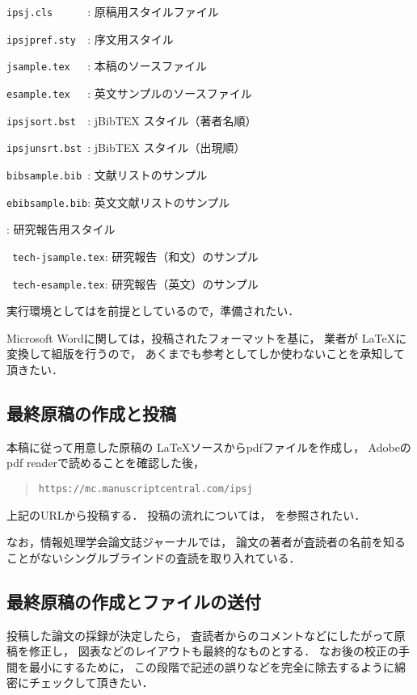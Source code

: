 \documentclass[submit]{ipsj}
\def\|{\verb|}
\begin{document}
\begin{Enumerate}
\item \|ipsj.cls      |: 原稿用スタイルファイル
\item \|ipsjpref.sty  |: 序文用スタイル
\item \|jsample.tex   |: 本稿のソースファイル
\item \|esample.tex   |: 英文サンプルのソースファイル
\item \|ipsjsort.bst  |: jBibTEX スタイル（著者名順）
\item \|ipsjunsrt.bst |: jBibTEX スタイル（出現順）
\item \|bibsample.bib |: 文献リストのサンプル
\item \|ebibsample.bib|: 英文文献リストのサンプル
\item {}: 研究報告用スタイル
\item \| tech-jsample.tex|: 研究報告（和文）のサンプル
\item \| tech-esample.tex|: 研究報告（英文）のサンプル
\end{Enumerate}%
実行環境としては\LaTeXe を前提としているので，準備されたい．


Microsoft Wordに関しては，投稿されたフォーマットを基に，
業者が \LaTeX に変換して組版を行うので，
あくまでも参考としてしか使わないことを承知して頂きたい．



\subsection{最終原稿の作成と投稿}

本稿に従って用意した原稿の \LaTeX ソースからpdfファイルを作成し，
Adobeのpdf readerで読めることを確認した後，
\begin{quote}
\small
\|https://mc.manuscriptcentral.com/ipsj|
\end{quote}
上記のURLから投稿する．
投稿の流れについては，
を参照されたい．

なお，情報処理学会論文誌ジャーナルでは，
論文の著者が査読者の名前を知ることがないシングルブラインドの査読を取り入れている．




\subsection{最終原稿の作成とファイルの送付}

投稿した論文の採録が決定したら，
査読者からのコメントなどにしたがって原稿を修正し，
図表などのレイアウトも最終的なものとする．
なお後の校正の手間を最小にするために，
この段階で記述の誤りなどを完全に除去するように綿密にチェックして頂きたい．
\end{document}
